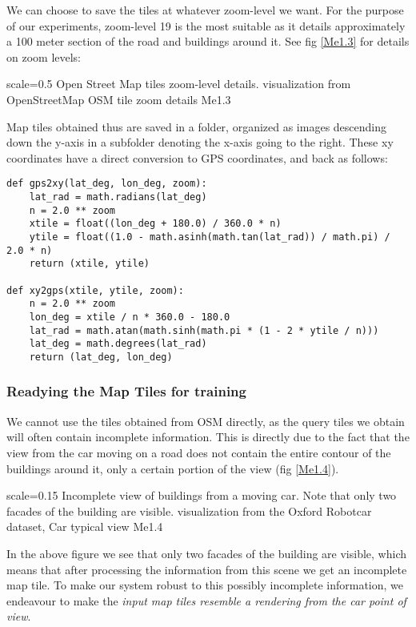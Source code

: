 We can choose to save the tiles at whatever zoom-level we want. For the purpose of our experiments, zoom-level 19 is the most suitable as it details approximately a 100 meter section of the road and buildings around it. See fig \ref{Me1.3} for details on zoom levels:

{scale=0.5}%
{Open Street Map tiles zoom-level details. visualization from OpenStreetMap}%
{OSM tile zoom details}%
{Me1.3}

Map tiles obtained thus are saved in a folder, organized as images descending down the y-axis in a subfolder denoting the x-axis going to the right. These xy coordinates have a direct conversion to GPS coordinates, and back as follows:

\begin{verbatim}
def gps2xy(lat_deg, lon_deg, zoom):
    lat_rad = math.radians(lat_deg)
    n = 2.0 ** zoom
    xtile = float((lon_deg + 180.0) / 360.0 * n)
    ytile = float((1.0 - math.asinh(math.tan(lat_rad)) / math.pi) / 2.0 * n)
    return (xtile, ytile)

def xy2gps(xtile, ytile, zoom):
    n = 2.0 ** zoom
    lon_deg = xtile / n * 360.0 - 180.0
    lat_rad = math.atan(math.sinh(math.pi * (1 - 2 * ytile / n)))
    lat_deg = math.degrees(lat_rad)
    return (lat_deg, lon_deg)
\end{verbatim}

\subsubsection{Readying the Map Tiles for training}
We cannot use the tiles obtained from OSM directly, as the query tiles we obtain will often contain incomplete information. This is directly due to the fact that the view from the car moving on a road does not contain the entire contour of the buildings around it, only a certain portion of the view (fig \ref{Me1.4}). 

{scale=0.15}%
{Incomplete view of buildings from a moving car. Note that only two facades of the building are visible. visualization from the Oxford Robotcar dataset,  \cite{newman2017}}%
{Car typical view}%
{Me1.4}

In the above figure we see that only two facades of the building are visible, which means that after processing the information from this scene we get an incomplete map tile. To make our system robust to this possibly incomplete information, we endeavour to make the  \textit{input map tiles resemble a rendering from the car point of view}.

